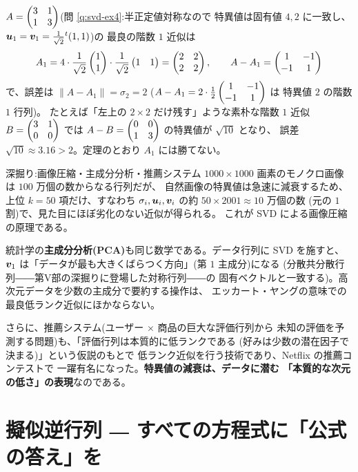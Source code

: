 \begin{rei}[階数 $1$ 近似]\label{rei:pinv-rank1approx}
$A = \begin{pmatrix}3 & 1 \\ 1 & 3\end{pmatrix}$(問 \ref{q:svd-ex4}:半正定値対称なので
特異値は固有値 $4, 2$ に一致し、
$\bm{u}_1 = \bm{v}_1 = \frac{1}{\sqrt{2}}{}^t(1, 1)$)の
最良の階数 $1$ 近似は
\[
A_1 = 4 \cdot \frac{1}{\sqrt{2}}\begin{pmatrix}1 \\ 1\end{pmatrix} \cdot
\frac{1}{\sqrt{2}}\begin{pmatrix}1 & 1\end{pmatrix} = \begin{pmatrix}2 & 2 \\ 2 & 2\end{pmatrix},
\qquad
A - A_1 = \begin{pmatrix}1 & -1 \\ -1 & 1\end{pmatrix}
\]
で、誤差は $\|A - A_1\| = \sigma_2 = 2$
($A - A_1 = 2 \cdot \frac{1}{2}\begin{pmatrix}1 & -1 \\ -1 & 1\end{pmatrix}$ は
特異値 $2$ の階数 $1$ 行列)。
たとえば「左上の $2 \times 2$ だけ残す」ような素朴な階数 $1$ 近似
$B = \begin{pmatrix}3 & 1 \\ 0 & 0\end{pmatrix}$ では
$A - B = \begin{pmatrix}0 & 0 \\ 1 & 3\end{pmatrix}$ の特異値が $\sqrt{10}$ となり、
誤差 $\sqrt{10} \approx 3.16 > 2$。定理のとおり $A_1$ には勝てない。
\end{rei}

\begin{itembox}[l]{深掘り:画像圧縮・主成分分析・推薦システム}
$1000 \times 1000$ 画素のモノクロ画像は $100$ 万個の数からなる行列だが、
自然画像の特異値は急速に減衰するため、上位 $k = 50$ 項だけ、すなわち
$\sigma_i, \bm{u}_i, \bm{v}_i$ の約 $50 \times 2001 \approx 10$ 万個の数
(元の $1$ 割)で、見た目にほぼ劣化のない近似が得られる。
これが SVD による画像圧縮の原理である。

統計学の\textbf{主成分分析(PCA)}も同じ数学である。データ行列に SVD を施すと、
$\bm{v}_1$ は「データが最も大きくばらつく方向」(第 $1$ 主成分)になる
(分散共分散行列――第V部の深掘りに登場した対称行列――の
固有ベクトルと一致する)。高次元データを少数の主成分で要約する操作は、
エッカート・ヤングの意味での最良低ランク近似にほかならない。

さらに、推薦システム(ユーザー × 商品の巨大な評価行列から
未知の評価を予測する問題)も、「評価行列は本質的に低ランクである
(好みは少数の潜在因子で決まる)」という仮説のもとで
低ランク近似を行う技術であり、Netflix の推薦コンテストで
一躍有名になった。\textbf{特異値の減衰は、データに潜む
「本質的な次元の低さ」の表現}なのである。
\end{itembox}

\section{擬似逆行列 ― すべての方程式に「公式の答え」を}

